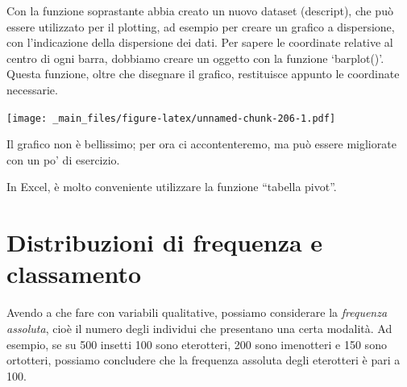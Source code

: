 \documentclass[a4paper,12pt,oneside]{book}
\newenvironment{Shaded}{\begin{snugshade}}{\end{snugshade}}
\newcommand{\KeywordTok}[1]{\textcolor[rgb]{0.13,0.29,0.53}{\textbf{#1}}}
\newcommand{\DataTypeTok}[1]{\textcolor[rgb]{0.13,0.29,0.53}{#1}}
\newcommand{\DecValTok}[1]{\textcolor[rgb]{0.00,0.00,0.81}{#1}}
\newcommand{\FloatTok}[1]{\textcolor[rgb]{0.00,0.00,0.81}{#1}}
\newcommand{\StringTok}[1]{\textcolor[rgb]{0.31,0.60,0.02}{#1}}
\newcommand{\OperatorTok}[1]{\textcolor[rgb]{0.81,0.36,0.00}{\textbf{#1}}}
\newcommand{\NormalTok}[1]{#1}
\theoremstyle{definition}
\theoremstyle{definition}
\theoremstyle{definition}
\theoremstyle{remark}
\begin{document}
Con la funzione soprastante abbia creato un nuovo dataset (descript),
che può essere utilizzato per il plotting, ad esempio per creare un
grafico a dispersione, con l'indicazione della dispersione dei dati. Per
sapere le coordinate relative al centro di ogni barra, dobbiamo creare
un oggetto con la funzione `barplot()'. Questa funzione, oltre che
disegnare il grafico, restituisce appunto le coordinate necessarie.

\begin{Shaded}
\end{Shaded}

\texttt{[image: \_main\_files/figure-latex/unnamed-chunk-206-1.pdf]}

Il grafico non è bellissimo; per ora ci accontenteremo, ma può essere
migliorate con un po' di esercizio.

In Excel, è molto conveniente utilizzare la funzione ``tabella pivot''.

\section*{Distribuzioni di frequenza e
classamento}\label{distribuzioni-di-frequenza-e-classamento}

Avendo a che fare con variabili qualitative, possiamo considerare la
\emph{frequenza assoluta}, cioè il numero degli individui che presentano
una certa modalità. Ad esempio, se su 500 insetti 100 sono eterotteri,
200 sono imenotteri e 150 sono ortotteri, possiamo concludere che la
frequenza assoluta degli eterotteri è pari a 100.
\end{document}
